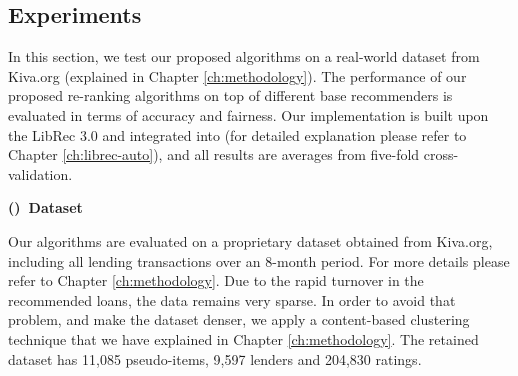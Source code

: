 \subsection{Experiments}
\label{subsect:exp}

In this section, we test our proposed algorithms on a real-world dataset from Kiva.org (explained in Chapter \ref{ch:methodology}). The performance of our proposed re-ranking algorithms on top of different base recommenders is evaluated in terms of accuracy and fairness. Our implementation is built upon the LibRec 3.0 \cite{guo2015librec} and integrated into \libauto{} (for detailed explanation please refer to Chapter \ref{ch:librec-auto}), and all results are averages from five-fold cross-validation.


\vspace{0.25cm}
\noindent \textbf{()~Dataset}
\vspace{0.25cm}



Our algorithms are evaluated on a proprietary dataset obtained from Kiva.org, including all lending transactions over an 8-month period. For more details please refer to Chapter \ref{ch:methodology}. Due to the rapid turnover in the recommended loans, the data remains very sparse. In order to avoid that problem, and make the dataset denser, we apply a content-based clustering technique that we have explained in Chapter \ref{ch:methodology}. The retained dataset has 11,085 pseudo-items, 9,597 lenders and 204,830 ratings.


